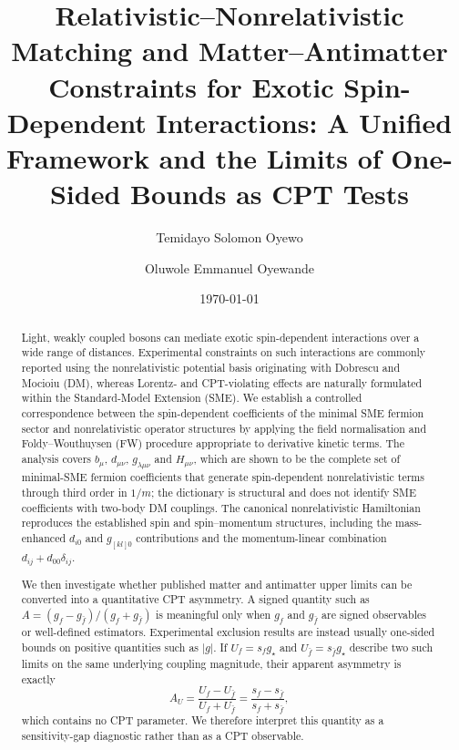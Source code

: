 \documentclass[aps,prd,reprint,superscriptaddress,nofootinbib]{revtex4-2}
\begin{document}
	
	\title{%
		Relativistic--Nonrelativistic Matching and Matter--Antimatter
		Constraints for Exotic Spin-Dependent Interactions:
		A Unified Framework and the Limits of One-Sided Bounds as CPT Tests
	}
	
	\author{Temidayo Solomon Oyewo}
	\author{Oluwole Emmanuel Oyewande}
	
	\date{\today}
	
	\begin{abstract}
		
		Light, weakly coupled bosons can mediate exotic spin-dependent
		interactions over a wide range of distances. Experimental constraints on
		such interactions are commonly reported using the nonrelativistic
		potential basis originating with Dobrescu and Mocioiu (DM), whereas
		Lorentz- and CPT-violating effects are naturally formulated within the
		Standard-Model Extension (SME). We establish a controlled correspondence
		between the spin-dependent coefficients of the minimal SME fermion sector and
		nonrelativistic operator structures by applying the field normalisation
		and Foldy--Wouthuysen (FW) procedure appropriate to derivative
		kinetic terms. The analysis covers $b_\mu$, $d_{\mu\nu}$, $g_{\lambda\mu\nu}$ and
$H_{\mu\nu}$, which are shown to be the complete set of minimal-SME
fermion coefficients that generate spin-dependent nonrelativistic terms
through third order in $1/m$; the dictionary is structural and does not
identify SME coefficients with two-body DM couplings. The
		canonical nonrelativistic Hamiltonian reproduces the established
		spin and spin--momentum structures, including the mass-enhanced $d_{i0}$ and $g_{[kl]0}$ contributions and
the momentum-linear combination $d_{ij}+d_{00}\delta_{ij}$.
		
		We then investigate whether published matter and antimatter upper limits
		can be converted into a quantitative CPT asymmetry. A signed quantity
		such as
		$A=(g_f-g_{\bar f})/(g_f+g_{\bar f})$
		is meaningful only when $g_f$ and $g_{\bar f}$ are signed observables or
		well-defined estimators. Experimental exclusion results are instead
		usually one-sided bounds on positive quantities such as $|g|$. If
		$U_f=s_f g_\star$ and $U_{\bar f}=s_{\bar f}g_\star$ describe two such
		limits on the same underlying coupling magnitude, their apparent
		asymmetry is exactly
		\[
		A_U=\frac{U_f-U_{\bar f}}{U_f+U_{\bar f}}
		=\frac{s_f-s_{\bar f}}{s_f+s_{\bar f}},
		\]
		which contains no CPT parameter. We therefore interpret this quantity
		as a sensitivity-gap diagnostic rather than as a CPT observable.
		

\end{abstract}
\end{document}
